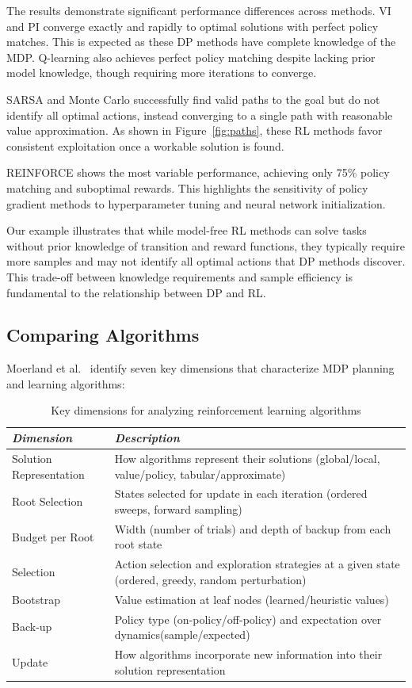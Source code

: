 The results demonstrate significant performance differences across methods. VI and PI converge exactly and rapidly to optimal solutions with perfect policy matches. This is expected as these DP methods have complete knowledge of the MDP. Q-learning also achieves perfect policy matching despite lacking prior model knowledge, though requiring more iterations to converge.

SARSA and Monte Carlo successfully find valid paths to the goal but do not identify all optimal actions, instead converging to a single path with reasonable value approximation. As shown in Figure~\ref{fig:paths}, these RL methods favor consistent exploitation once a workable solution is found.

REINFORCE shows the most variable performance, achieving only 75\% policy matching and suboptimal rewards. This highlights the sensitivity of policy gradient methods to hyperparameter tuning and neural network initialization.

Our example illustrates that while model-free RL methods can solve tasks without prior knowledge of transition and reward functions, they typically require more samples and may not identify all optimal actions that DP methods discover. This trade-off between knowledge requirements and sample efficiency is fundamental to the relationship between DP and RL.

\subsection{Comparing Algorithms}

Moerland et al.~\cite{moerland2022unifying} identify seven key dimensions that characterize MDP planning and learning algorithms:

\begin{table}[h!]
\centering
\caption{Key dimensions for analyzing reinforcement learning algorithms}
\label{tab:dimensions}
\begin{tabular}{p{2.5cm}|p{8.5cm}}
\hline
\textit{Dimension} & \textit{Description} \\
\hline
Solution Representation & How algorithms represent their solutions (global/local, value/policy, tabular/approximate) \\
\hline
Root Selection\footnotemark[1] & States selected for update in each iteration (ordered sweeps, forward sampling) \\
\hline
Budget per Root & Width (number of trials) and depth of backup from each root state \\
\hline
Selection & Action selection and exploration strategies at a given state (ordered, greedy, random perturbation) \\
\hline
Bootstrap & Value estimation at leaf nodes (learned/heuristic values) \\
\hline
Back-up\footnotemark[2] & Policy type (on-policy/off-policy) and expectation over dynamics\footnotemark[3] (sample/expected) \\
\hline
Update & How algorithms incorporate new information into their solution representation \\
\hline
\end{tabular}
\end{table}

